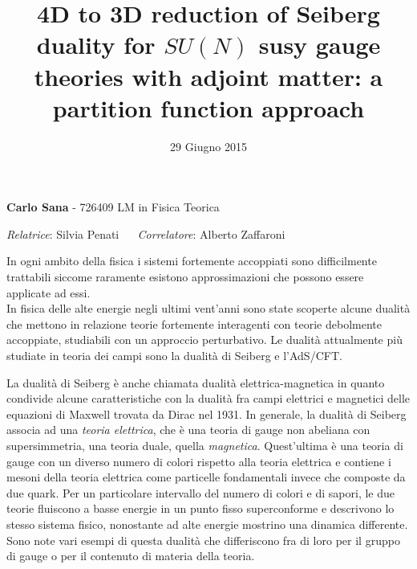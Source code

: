 \documentclass[a4paper,12pt]{article}
\title{\textbf{4D to 3D reduction of Seiberg duality for $SU(N)$ susy gauge theories with adjoint matter: a partition function approach }
\vspace{-0.5cm} }
\date{29 Giugno 2015}
\begin{document}
\maketitle
\vspace*{-1.5cm}
	 \textbf{ \large {Carlo Sana} }  - 726409 
 \hfill
 LM in Fisica Teorica 
\\
\vspace{-0.5cm}
\begin{center}
\textit{Relatrice}: 
\textsf{Silvia Penati} 
~~
\textit{Correlatore}:
\textsf{Alberto Zaffaroni}

\end{center}

In ogni ambito della fisica i sistemi fortemente accoppiati sono difficilmente trattabili siccome raramente esistono approssimazioni che possono essere applicate ad essi.\\
In fisica delle alte energie negli ultimi vent'anni sono state scoperte alcune dualità che mettono in relazione teorie fortemente interagenti con teorie debolmente accoppiate, studiabili con un approccio perturbativo.
Le dualità attualmente più studiate in teoria dei campi sono la dualità di Seiberg e l'AdS/CFT.

La dualità di Seiberg è anche chiamata dualità elettrica-magnetica in quanto condivide alcune caratteristiche con la dualità fra campi elettrici e magnetici delle equazioni di Maxwell trovata da Dirac nel 1931. 
In generale, la dualità di Seiberg associa ad una \emph{teoria elettrica}, che è una teoria di gauge non abeliana con supersimmetria, una teoria duale, quella \emph{magnetica}.
Quest'ultima è una teoria di gauge con un diverso numero di colori rispetto alla teoria elettrica e contiene i mesoni della teoria elettrica come particelle fondamentali invece che composte da due quark.
Per un particolare intervallo del numero di colori e di sapori, le due teorie fluiscono a basse energie in un punto fisso superconforme e descrivono lo stesso sistema fisico, nonostante ad alte energie mostrino una dinamica differente.
Sono note vari esempi di questa dualità che differiscono fra di loro per il gruppo di gauge o per il contenuto di materia della teoria.
\end{document}
